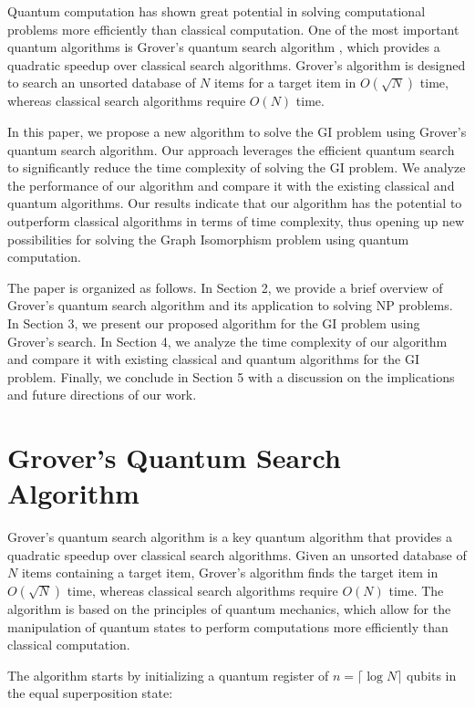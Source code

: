Quantum computation has shown great potential in solving computational problems more efficiently than classical computation. One of the most important quantum algorithms is Grover's quantum search algorithm \cite{grover}, which provides a quadratic speedup over classical search algorithms. Grover's algorithm is designed to search an unsorted database of $N$ items for a target item in $O\left(\sqrt{N}\right)$ time, whereas classical search algorithms require $O(N)$ time.

In this paper, we propose a new algorithm to solve the GI problem using Grover's quantum search algorithm. Our approach leverages the efficient quantum search to significantly reduce the time complexity of solving the GI problem. We analyze the performance of our algorithm and compare it with the existing classical and quantum algorithms. Our results indicate that our algorithm has the potential to outperform classical algorithms in terms of time complexity, thus opening up new possibilities for solving the Graph Isomorphism problem using quantum computation.

The paper is organized as follows. In Section 2, we provide a brief overview of Grover's quantum search algorithm and its application to solving NP problems. In Section 3, we present our proposed algorithm for the GI problem using Grover's search. In Section 4, we analyze the time complexity of our algorithm and compare it with existing classical and quantum algorithms for the GI problem. Finally, we conclude in Section 5 with a discussion on the implications and future directions of our work.

\section{Grover's Quantum Search Algorithm}

Grover's quantum search algorithm \cite{grover} is a key quantum algorithm that provides a quadratic speedup over classical search algorithms. Given an unsorted database of $N$ items containing a target item, Grover's algorithm finds the target item in $O\left(\sqrt{N}\right)$ time, whereas classical search algorithms require $O(N)$ time. The algorithm is based on the principles of quantum mechanics, which allow for the manipulation of quantum states to perform computations more efficiently than classical computation.

The algorithm starts by initializing a quantum register of $n = \lceil \log N \rceil$ qubits in the equal superposition state:

